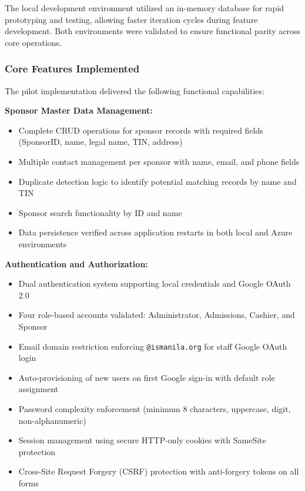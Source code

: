 The local development environment utilized an in-memory database for rapid prototyping and testing, allowing faster iteration cycles during feature development. Both environments were validated to ensure functional parity across core operations.

\subsubsection{Core Features Implemented}

The pilot implementation delivered the following functional capabilities:

\textbf{Sponsor Master Data Management:}
\begin{itemize}
    \item Complete CRUD operations for sponsor records with required fields (SponsorID, name, legal name, TIN, address)
    \item Multiple contact management per sponsor with name, email, and phone fields
    \item Duplicate detection logic to identify potential matching records by name and TIN
    \item Sponsor search functionality by ID and name
    \item Data persistence verified across application restarts in both local and Azure environments
\end{itemize}

\textbf{Authentication and Authorization:}
\begin{itemize}
    \item Dual authentication system supporting local credentials and Google OAuth 2.0
    \item Four role-based accounts validated: Administrator, Admissions, Cashier, and Sponsor
    \item Email domain restriction enforcing \texttt{@ismanila.org} for staff Google OAuth login
    \item Auto-provisioning of new users on first Google sign-in with default role assignment
    \item Password complexity enforcement (minimum 8 characters, uppercase, digit, non-alphanumeric)
    \item Session management using secure HTTP-only cookies with SameSite protection
    \item Cross-Site Request Forgery (CSRF) protection with anti-forgery tokens on all forms
\end{itemize}

